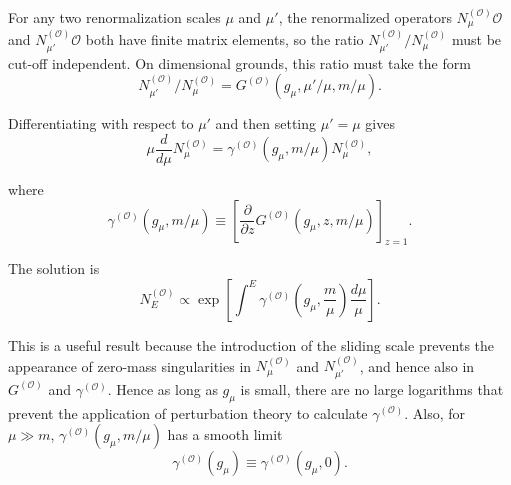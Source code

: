 For any two renormalization scales $\mu$ and $\mu'$, the renormalized
operators $N_\mu^{(\mathcal O)}\mathcal O$ and
$N_{\mu'}^{(\mathcal O)}\mathcal O$ both have finite matrix elements, so the
ratio $N_{\mu'}^{(\mathcal O)}/N_\mu^{(\mathcal O)}$ must be cut-off
independent. On dimensional grounds, this ratio must take the form
\begin{equation}
N_{\mu'}^{(\mathcal O)}/N_\mu^{(\mathcal O)}
=G^{(\mathcal O)}(g_\mu,\mu'/\mu,m/\mu).
\tag{18.2.24}\label{eq:18.2.24}
\end{equation}
\par\noindent
Differentiating with respect to $\mu'$ and then setting $\mu'=\mu$ gives
\begin{equation}
\mu\frac{d}{d\mu}N_\mu^{(\mathcal O)}
=\gamma^{(\mathcal O)}(g_\mu,m/\mu)N_\mu^{(\mathcal O)},
\tag{18.2.25}\label{eq:18.2.25}
\end{equation}
\par\noindent
where
\begin{equation}
\gamma^{(\mathcal O)}(g_\mu,m/\mu)
\equiv\left[\frac{\partial}{\partial z}
G^{(\mathcal O)}(g_\mu,z,m/\mu)\right]_{z=1}.
\tag{18.2.26}\label{eq:18.2.26}
\end{equation}
\par\noindent
The solution is
\begin{equation}
N_E^{(\mathcal O)}\propto
\exp\left[\int^E\gamma^{(\mathcal O)}
\left(g_\mu,\frac{m}{\mu}\right)\frac{d\mu}{\mu}\right].
\tag{18.2.27}\label{eq:18.2.27}
\end{equation}
\par\noindent
This is a useful result because the introduction of the sliding scale
prevents the appearance of zero-mass singularities in
$N_\mu^{(\mathcal O)}$ and $N_{\mu'}^{(\mathcal O)}$, and hence also in
$G^{(\mathcal O)}$ and $\gamma^{(\mathcal O)}$. Hence as long as $g_\mu$ is
small, there are no large logarithms that prevent the application of
perturbation theory to calculate $\gamma^{(\mathcal O)}$. Also, for
$\mu\gg m$, $\gamma^{(\mathcal O)}(g_\mu,m/\mu)$ has a smooth limit
\begin{equation}
\gamma^{(\mathcal O)}(g_\mu)
\equiv\gamma^{(\mathcal O)}(g_\mu,0).
\tag{18.2.28}\label{eq:18.2.28}
\end{equation}
\par\noindent

